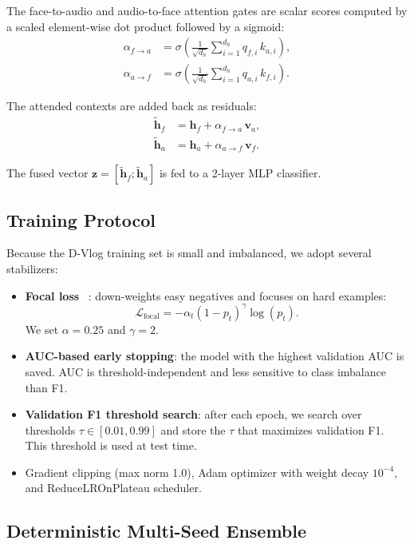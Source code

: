 \documentclass[conference]{IEEEtran}
\begin{document}
The face-to-audio and audio-to-face attention gates are scalar scores computed by a scaled element-wise dot product followed by a sigmoid:
\begin{align}
\alpha_{f\to a} &= \sigma\!\left(\frac{1}{\sqrt{d_h}} \sum_{i=1}^{d_h} q_{f,i}\,k_{a,i}\right), \\
\alpha_{a\to f} &= \sigma\!\left(\frac{1}{\sqrt{d_h}} \sum_{i=1}^{d_h} q_{a,i}\,k_{f,i}\right).
\end{align}

The attended contexts are added back as residuals:
\begin{align}
\tilde{\mathbf{h}}_f &= \mathbf{h}_f + \alpha_{f\to a}\,\mathbf{v}_a, \\
\tilde{\mathbf{h}}_a &= \mathbf{h}_a + \alpha_{a\to f}\,\mathbf{v}_f.
\end{align}

The fused vector $\mathbf{z}=[\tilde{\mathbf{h}}_f;\tilde{\mathbf{h}}_a]$ is fed to a 2-layer MLP classifier.

\subsection{Training Protocol}

Because the D-Vlog training set is small and imbalanced, we adopt several stabilizers:
\begin{itemize}
    \item \textbf{Focal loss}~
\cite{lin2017focal}: down-weights easy negatives and focuses on hard examples:
    \begin{equation}
    \mathcal{L}_{\text{focal}} = -\alpha_t (1-p_t)^\gamma \log(p_t).
    \end{equation}
    We set $\alpha=0.25$ and $\gamma=2$.
    \item \textbf{AUC-based early stopping}: the model with the highest validation AUC is saved.
    AUC is threshold-independent and less sensitive to class imbalance than F1.
    \item \textbf{Validation F1 threshold search}: after each epoch, we search over thresholds $\tau\in[0.01,0.99]$ and store the $\tau$ that maximizes validation F1.
    This threshold is used at test time.
    \item Gradient clipping (max norm 1.0), Adam optimizer with weight decay $10^{-4}$, and ReduceLROnPlateau scheduler.
\end{itemize}

\subsection{Deterministic Multi-Seed Ensemble}
\end{document}
